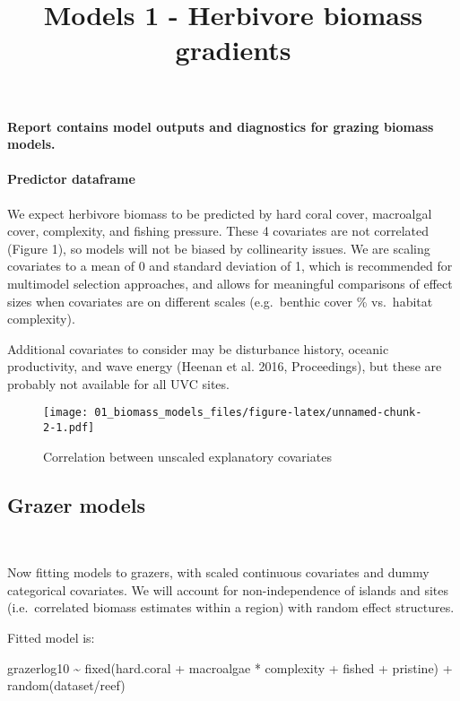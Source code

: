 \documentclass[]{article}
\title{Models 1 - Herbivore biomass gradients}
\author{}
\date{}
\let\oldparagraph\paragraph
\renewcommand{\paragraph}[1]{\oldparagraph{#1}\mbox{}}
\begin{document}
\maketitle

\paragraph{Report contains model outputs and diagnostics for grazing
biomass
models.}\label{report-contains-model-outputs-and-diagnostics-for-grazing-biomass-models.}

\paragraph{Predictor dataframe}\label{predictor-dataframe}

We expect herbivore biomass to be predicted by hard coral cover,
macroalgal cover, complexity, and fishing pressure. These 4 covariates
are not correlated (Figure 1), so models will not be biased by
collinearity issues. We are scaling covariates to a mean of 0 and
standard deviation of 1, which is recommended for multimodel selection
approaches, and allows for meaningful comparisons of effect sizes when
covariates are on different scales (e.g.~benthic cover \% vs.~habitat
complexity).

Additional covariates to consider may be disturbance history, oceanic
productivity, and wave energy (Heenan et al. 2016, Proceedings), but
these are probably not available for all UVC sites.

\begin{figure}
\centering
\texttt{[image: 01\_biomass\_models\_files/figure-latex/unnamed-chunk-2-1.pdf]}
\caption{Correlation between unscaled explanatory covariates}
\end{figure}

\newpage

\subsection{Grazer models}\label{grazer-models}

~

Now fitting models to grazers, with scaled continuous covariates and
dummy categorical covariates. We will account for non-independence of
islands and sites (i.e.~correlated biomass estimates within a region)
with random effect structures.

Fitted model is:

grazerlog10 \textasciitilde{} fixed(hard.coral + macroalgae * complexity
+ fished + pristine) + random(dataset/reef)
\end{document}
